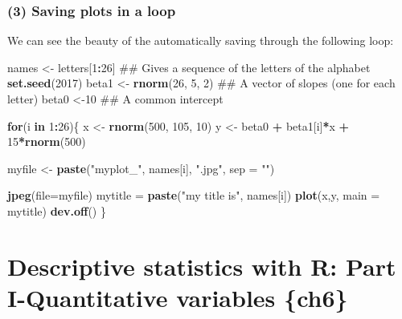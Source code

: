 \documentclass[]{book}
\newenvironment{Shaded}{\begin{snugshade}}{\end{snugshade}}
\newcommand{\KeywordTok}[1]{\textcolor[rgb]{0.13,0.29,0.53}{\textbf{#1}}}
\newcommand{\DataTypeTok}[1]{\textcolor[rgb]{0.13,0.29,0.53}{#1}}
\newcommand{\DecValTok}[1]{\textcolor[rgb]{0.00,0.00,0.81}{#1}}
\newcommand{\StringTok}[1]{\textcolor[rgb]{0.31,0.60,0.02}{#1}}
\newcommand{\ControlFlowTok}[1]{\textcolor[rgb]{0.13,0.29,0.53}{\textbf{#1}}}
\newcommand{\OperatorTok}[1]{\textcolor[rgb]{0.81,0.36,0.00}{\textbf{#1}}}
\newcommand{\NormalTok}[1]{#1}
\theoremstyle{definition}
\theoremstyle{definition}
\theoremstyle{definition}
\theoremstyle{remark}
\begin{document}
\subsection{(3) Saving plots in a loop}\label{saving-plots-in-a-loop}

We can see the beauty of the automatically saving through the following
loop:

\begin{Shaded}
\begin{Highlighting}[]
\NormalTok{names <-}\StringTok{ }\NormalTok{letters[}\DecValTok{1}\OperatorTok{:}\DecValTok{26}\NormalTok{] ## Gives a sequence of the letters of the alphabet}
\KeywordTok{set.seed}\NormalTok{(}\DecValTok{2017}\NormalTok{)}
\NormalTok{beta1 <-}\StringTok{ }\KeywordTok{rnorm}\NormalTok{(}\DecValTok{26}\NormalTok{, }\DecValTok{5}\NormalTok{, }\DecValTok{2}\NormalTok{) ## A vector of slopes (one for each letter)}
\NormalTok{beta0 <-}\DecValTok{10}\NormalTok{ ## A common intercept}

\ControlFlowTok{for}\NormalTok{(i }\ControlFlowTok{in} \DecValTok{1}\OperatorTok{:}\DecValTok{26}\NormalTok{)\{}
\NormalTok{ x <-}\StringTok{ }\KeywordTok{rnorm}\NormalTok{(}\DecValTok{500}\NormalTok{, }\DecValTok{105}\NormalTok{, }\DecValTok{10}\NormalTok{)}
\NormalTok{ y <-}\StringTok{ }\NormalTok{beta0 }\OperatorTok{+}\StringTok{ }\NormalTok{beta1[i]}\OperatorTok{*}\NormalTok{x }\OperatorTok{+}\StringTok{ }\DecValTok{15}\OperatorTok{*}\KeywordTok{rnorm}\NormalTok{(}\DecValTok{500}\NormalTok{)}

\NormalTok{ myfile <-}\StringTok{ }\KeywordTok{paste}\NormalTok{(}\StringTok{"myplot_"}\NormalTok{, names[i], }\StringTok{".jpg"}\NormalTok{, }\DataTypeTok{sep =} \StringTok{""}\NormalTok{)}

 \KeywordTok{jpeg}\NormalTok{(}\DataTypeTok{file=}\NormalTok{myfile)}
\NormalTok{    mytitle =}\StringTok{ }\KeywordTok{paste}\NormalTok{(}\StringTok{"my title is"}\NormalTok{, names[i])}
    \KeywordTok{plot}\NormalTok{(x,y, }\DataTypeTok{main =}\NormalTok{ mytitle)}
 \KeywordTok{dev.off}\NormalTok{()}
\NormalTok{\}}
\end{Highlighting}
\end{Shaded}

\chapter{Descriptive statistics with R: Part I-Quantitative variables
\{ch6\}}\label{descriptive-statistics-with-r-part-i-quantitative-variables-ch6}
\end{document}
